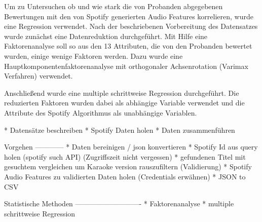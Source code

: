 Um zu Untersuchen ob und wie stark die von Probanden abgegebenen Bewertungen mit den von Spotify generierten Audio Features korrelieren, wurde eine Regression verwendet.
Nach der beschriebenen Vorbereitung des Datensatzes wurde zunächst eine Datenreduktion durchgeführt.
Mit Hilfe eine Faktorenanalyse soll so aus den 13 Attributen, die von den Probanden bewertet wurden, einige wenige Faktoren werden.
Dazu wurde eine Hauptkomponentenfaktorenanalyse mit orthogonaler Achsenrotation (Varimax Verfahren) verwendet.

Anschließend wurde eine multiple schrittweise Regression durchgeführt.
Die reduzierten Faktoren wurden dabei als abhängige Variable verwendet und die Attribute des Spotify Algorithmus als unabhängige Variablen.





 * Datensätze beschreiben
 * Spotify Daten holen
 * Daten zusammenführen

Vorgehen
------------
 * Daten bereinigen / json konvertieren
 * Spotify Id aus query holen (spotify such API) (Zugriffszeit nicht vergessen)
 * gefundenen Titel mit gesuchtem vergleichen um Karaoke version rauszufiltern (Validierung)
 * Spotify Audio Features zu validierten Daten holen (Credentials erwähnen)
 * JSON to CSV
 

Statistische Methoden
----------------------------
 * Faktorenanalyse
 * multiple schrittweise Regression

